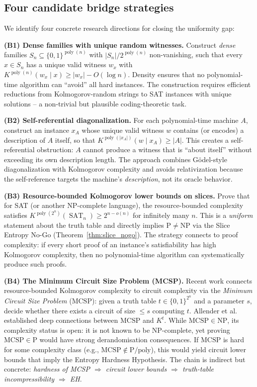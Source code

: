\documentclass[aps,prd,twocolumn,superscriptaddress,nofootinbib]{revtex4-2}
\theoremstyle{definition}
\theoremstyle{remark}
\DeclareMathOperator{\poly}{poly}
\DeclareMathOperator{\SAT}{SAT}
\newcommand{\NP}{\mathrm{NP}}
\newcommand{\PP}{\mathrm{P}}
\begin{document}
\subsection{Four candidate bridge strategies}

We identify four concrete research directions for closing the uniformity gap:

\textbf{(B1) Dense families with unique random witnesses.} Construct \textit{dense} families $S_n \subseteq \{0,1\}^{\poly(n)}$ with $|S_n|/2^{\poly(n)}$ non-vanishing, such that every $x \in S_n$ has a unique valid witness $w_x$ with $K^{\poly(n)}(w_x \mid x) \geq |w_x| - O(\log n)$. Density ensures that no polynomial-time algorithm can ``avoid'' all hard instances. The construction requires efficient reductions from Kolmogorov-random strings to SAT instances with unique solutions -- a non-trivial but plausible coding-theoretic task.

\textbf{(B2) Self-referential diagonalization.} For each polynomial-time machine $A$, construct an instance $x_A$ whose unique valid witness $w$ contains (or encodes) a description of $A$ itself, so that $K^{\poly(|x_A|)}(w \mid x_A) \geq |A|$. This creates a self-referential obstruction: $A$ cannot produce a witness that is ``about itself'' without exceeding its own description length. The approach combines G\"odel-style diagonalization with Kolmogorov complexity and avoids relativization because the self-reference targets the machine's \textit{description}, not its oracle behavior.

\textbf{(B3) Resource-bounded Kolmogorov lower bounds on slices.} Prove that for SAT (or another NP-complete language), the resource-bounded complexity satisfies $K^{\poly(2^n)}(\SAT_n) \geq 2^{n-o(n)}$ for infinitely many $n$. This is a \textit{uniform} statement about the truth table and directly implies $\PP \neq \NP$ via the Slice Entropy No-Go (Theorem~\ref{thm:slice_nogo}). The strategy connects to proof complexity: if every short proof of an instance's satisfiability has high Kolmogorov complexity, then no polynomial-time algorithm can systematically produce such proofs.

\textbf{(B4) The Minimum Circuit Size Problem (MCSP).} Recent work connects resource-bounded Kolmogorov complexity to circuit complexity via the \textit{Minimum Circuit Size Problem} ($\mathrm{MCSP}$): given a truth table $t \in \{0,1\}^{2^n}$ and a parameter $s$, decide whether there exists a circuit of size $\leq s$ computing $t$. Allender et al.~\cite{Allender2006} established deep connections between $\mathrm{MCSP}$ and $K^t$. While $\mathrm{MCSP} \in \NP$, its complexity status is open: it is not known to be $\NP$-complete, yet proving $\mathrm{MCSP} \in \PP$ would have strong derandomisation consequences. If $\mathrm{MCSP}$ is hard for some complexity class (e.g., $\mathrm{MCSP} \notin \PP/\mathrm{poly}$), this would yield circuit lower bounds that imply the Entropy Hardness Hypothesis. The chain is indirect but concrete: \textit{hardness of MCSP $\Rightarrow$ circuit lower bounds $\Rightarrow$ truth-table incompressibility $\Rightarrow$ EH}.
\end{document}
